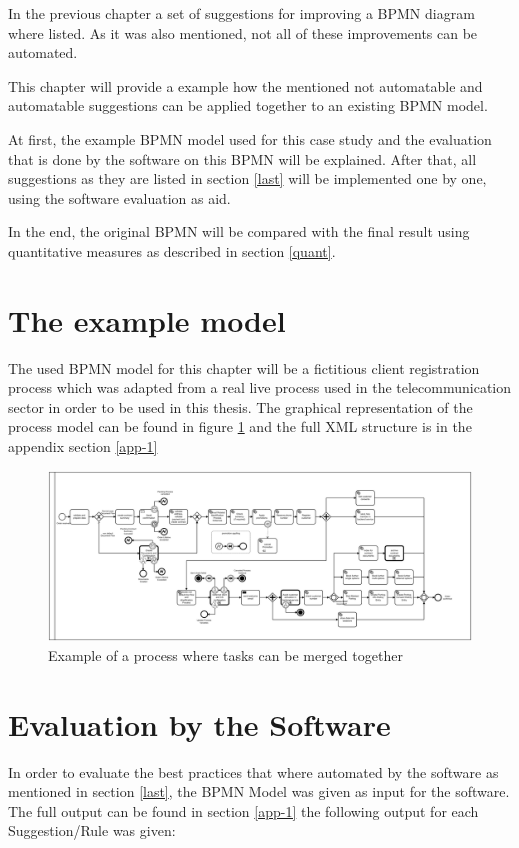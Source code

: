 \label{chapter-5}
In the previous chapter a set of suggestions for improving a BPMN diagram where listed. As it was also mentioned, not all of these improvements can be automated. 

This chapter will provide a example how the mentioned not automatable and automatable suggestions can be applied together to an existing BPMN model. 

At first, the example BPMN model used for this case study and the evaluation that is done by the software on this BPMN will be explained. After that, all suggestions as they are listed in section \ref{last} will be implemented one by one, using the software evaluation as aid. 

In the end, the original BPMN will be compared with the final result using quantitative measures as described in section \ref{quant}.

\section{The example model}
The used BPMN model for this chapter will be a fictitious client registration process which was adapted from a real live process used in the telecommunication sector in order to be used in this thesis. The graphical representation of the process model can be found in figure \ref{fig:example-process} and the full XML structure is in the appendix section \ref{app-1}

\begin{figure}[H]
	\centering
	\includegraphics[width=1.7\columnwidth, angle=90 ]{graphics/process-bpmn.pdf}
	\caption{Example of a process where tasks can be merged together} 
	\label{fig:example-process} 
\end{figure}

\section{Evaluation by the Software}
In order to evaluate the best practices that where automated by the software as mentioned in section \ref{last}, the BPMN Model was given as input for the software. The full output can be found in section \ref{app-1} the following output for each Suggestion/Rule was given:
